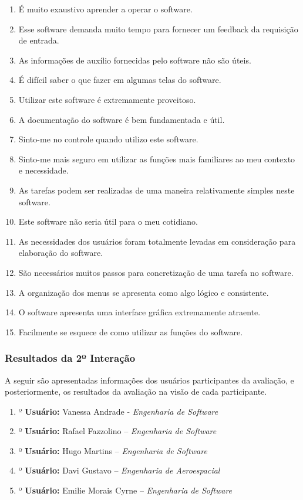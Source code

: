 				\begin{enumerate}
					\item{É muito exaustivo aprender a operar o software.}
					\item{Esse software demanda muito tempo para fornecer um feedback da requisição de entrada.}
					\item{As informações de auxílio fornecidas pelo software não são úteis.}
					\item{É difícil saber o que fazer em algumas telas do software.}
					\item{Utilizar este software é extremamente proveitoso.}
					\item{A documentação do software é bem fundamentada e útil.}
					\item{Sinto-me no controle quando utilizo este software.}
					\item{Sinto-me mais seguro em utilizar as funções mais familiares ao meu contexto e necessidade.}
					\item{As tarefas podem ser realizadas de uma maneira relativamente simples neste software.}
					\item{Este software não seria útil para o meu cotidiano.}
					\item{As necessidades dos usuários foram totalmente levadas em consideração para elaboração do software.}
					\item{São necessários muitos passos para concretização de uma tarefa no software.}
					\item{A organização dos menus se apresenta como algo lógico e consistente.}
					\item{O software apresenta uma interface gráfica extremamente atraente.}
					\item{Facilmente se esquece de como utilizar as funções do software.}
				\end{enumerate}

			\subsubsection[Resultados da 2º Interação]{Resultados da 2º Interação}
			\label{sec:terceiraAvaliacao_2_Resultados}

				A seguir são apresentadas informações dos usuários participantes da avaliação, e posteriormente, os resultados da avaliação na visão de cada participante.

				\begin{enumerate}
					\item{º \textbf{Usuário:} Vanessa Andrade - \emph{Engenharia de Software}}
					\item{º \textbf{Usuário:} Rafael Fazzolino – \emph{Engenharia de Software}}
					\item{º \textbf{Usuário:} Hugo Martins – \emph{Engenharia de Software}}
					\item{º \textbf{Usuário:} Davi Gustavo – \emph{Engenharia de Aeroespacial}}
					\item{º \textbf{Usuário:} Emilie Morais Cyrne – \emph{Engenharia de Software}}
				\end{enumerate}

